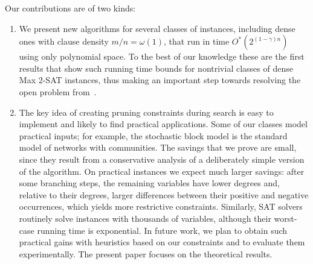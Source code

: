 \documentclass[11pt,a4paper]{article}
\theoremstyle{definition}
\theoremstyle{remark}
\newcommand{\Ostar}{O^{*}}
\begin{document}
Our contributions are of two kinds:
\begin{enumerate}
	\item We present new algorithms for several classes of instances, including dense ones with clause density $m/n=\omega(1)$, that run in time  $\Ostar(2^{(1-\gamma)n})$ using only polynomial space.  To the best of our knowledge these are the first results that show such running time bounds for nontrivial classes of dense Max 2-SAT instances, thus making an important step towards resolving the open problem from~\cite{Williams,WOEGINGER}.
	\item The key idea of creating pruning constraints during search is easy to implement and likely to find practical applications. Some of our classes model practical inputs; for example, the stochastic block model is the standard model of networks with communities. The savings that we prove are small, since they result from a conservative analysis of a deliberately simple version of the algorithm. On practical instances we expect much larger savings: after some branching steps, the remaining variables have lower degrees and, relative to their degrees, larger differences between their positive and negative occurrences, which yields more restrictive constraints. Similarly, SAT solvers routinely solve instances with thousands of variables, although their worst-case running time is exponential. In future work, we plan to obtain such practical gains with heuristics based on our constraints and to evaluate them experimentally. The present paper focuses on the theoretical results.
\end{enumerate}


	
%
\end{document}
